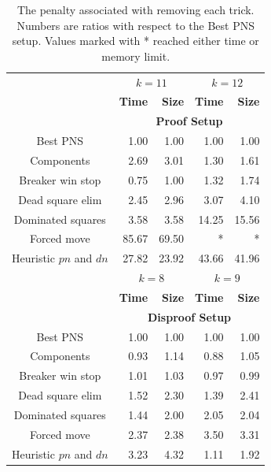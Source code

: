 \documentclass[conference]{IEEEtran}
\theoremstyle{definition}
\newcommand{\pn}{$pn$\xspace}
\newcommand{\dn}{$dn$\xspace}
\begin{document}
\begin{table}[htbp]
\caption{The penalty associated with removing each trick. Numbers are ratios with respect to the Best PNS setup. Values marked with * reached either time or memory limit.}
\begin{center}
\begin{tabular}{ c | r r | r r }
\hline
& \multicolumn{2}{c}{$k=11$} & \multicolumn{2}{c}{$k=12$} \\
& \textbf{Time} & \textbf{Size} & \textbf{Time} & \textbf{Size}\\
\hline 
& \multicolumn{4}{c}{\bf {Proof Setup}} \\
Best PNS & 1.00 & 1.00  & 1.00 & 1.00  \\
Components & 2.69 & 3.01  & 1.30 & 1.61  \\
Breaker win stop & 0.75 & 1.00  & 1.32 & 1.74  \\
Dead square elim & 2.45 & 2.96  & 3.07 & 4.10  \\
Dominated squares & 3.58 & 3.58  & 14.25 & 15.56  \\
Forced move & 85.67 & 69.50  & * & *  \\
Heuristic \pn and \dn & 27.82 & 23.92  & 43.66 & 41.96  \\



\hline 
& \multicolumn{2}{c}{$k=8$} & \multicolumn{2}{c}{$k=9$} \\
& \textbf{Time} & \textbf{Size} & \textbf{Time} & \textbf{Size}\\
\hline 

& \multicolumn{4}{c}{\bf {Disproof Setup}} \\
Best PNS & 1.00 & 1.00  & 1.00 & 1.00  \\
Components & 0.93 & 1.14  & 0.88 & 1.05  \\
Breaker win stop & 1.01 & 1.03  & 0.97 & 0.99  \\
Dead square elim & 1.52 & 2.30  & 1.39 & 2.41  \\
Dominated squares & 1.44 & 2.00  & 2.05 & 2.04  \\
Forced move & 2.37 & 2.38  & 3.50 & 3.31  \\
Heuristic \pn and \dn & 3.23 & 4.32  & 1.11 & 1.92  \\


\end{tabular}
\end{center}
\end{table}
\end{document}
